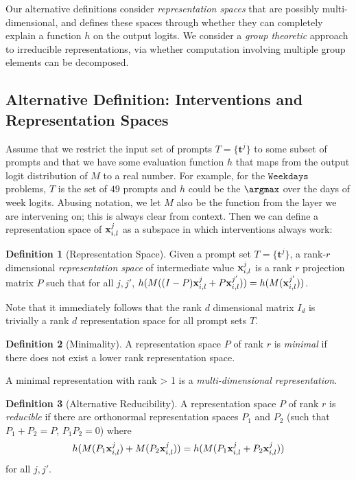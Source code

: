 \documentclass{article} %
\theoremstyle{plain}
\theoremstyle{definition}
\newtheorem{definition}{Definition}
\begin{document}
Our alternative definitions consider \textit{representation spaces} that are possibly multi-dimensional, and defines these spaces through whether they can completely explain a function $h$ on the output logits. We consider a \textit{group theoretic} approach to irreducible representations, via whether computation involving multiple group elements can be decomposed.

\subsection{Alternative Definition: Interventions and Representation Spaces}


Assume that we restrict the input set of prompts $T = \{\mathbf{t}^j\}$ to some subset of prompts and that we have some evaluation function $h$ that maps from the output logit distribution of $M$ to a real number. For example, for the $\texttt{Weekdays}$ problems, $T$ is the set of $49$ prompts and $h$ could be the $\argmax$ over the days of week logits. Abusing notation, we let $M$ also be the function from the layer we are intervening on; this is always clear from context. Then we can define a representation space of $\mathbf{x}^j_{i,l}$ as a subspace in which interventions always work: 
\begin{definition}[Representation Space]
\label{def:appendix_representation_space}
Given a prompt set  $T = \{\mathbf{t}^j\}$, a rank-$r$ dimensional \textit{representation space} of intermediate value $\mathbf{x}^j_{i,l}$ is a rank $r$ projection matrix $P$ such that for all $j, j'$, $h(M((I-P)\mathbf{x}^j_{i,l} + P\mathbf{x}^{j'}_{i,l}))=h(M(\mathbf{x}^{j'}_{i,l}))$.
\end{definition}

Note that it immediately follows that the rank $d$ dimensional matrix $I_d$ is trivially a rank $d$ representation space for all prompt sets $T$.

\begin{definition}[Minimality]
A representation space $P$ of rank $r$ is \textit{minimal} if there does not exist a lower rank representation space.
\end{definition}

A minimal representation with rank > 1 is a \textit{multi-dimensional representation}.


\begin{definition}[Alternative Reducibility]
\label{def:app_reducibility_1}
A representation space  $P$ of rank $r$ is \textit{reducible} if there are orthonormal representation spaces $P_1$ and $P_2$ (such that $P_1+P_2=P$,  $P_1P_2=0$) where $$h(M(P_1\mathbf{x}_{i,l}^j) + M(P_2\mathbf{x}_{i,l}^{j})) = h(M(P_1\mathbf{x}_{i,l}^j + P_2\mathbf{x}_{i,l}^{j}))$$ for all $j, j'$.
\end{definition}
\end{document}
